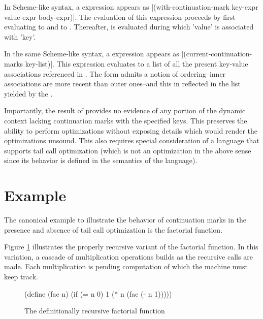 In Scheme-like syntax, a  expression appears as
\scheme|(with-continuation-mark key-expr value-expr body-expr)|. The evaluation of this
expression proceeds by first evaluating  to  and
 to . Thereafter,  is evaluated during 
which \scheme'value' is associated with \scheme'key'.

In the same Scheme-like syntax, a  expression appears
as \scheme|(current-continuation-marks key-list)|. This expression evaluates to a list of
all the present key-value associations referenced in . The
 form admits a notion of ordering--inner associations are
more recent than outer ones--and this in reflected in the list yielded by the
.

Importantly, the result of  provides no evidence of any
portion of the dynamic context lacking continuation marks with the specified keys. This
preserves the ability to perform optimizations without exposing details which would render
the optimizations unsound. This also requires special consideration of a language that
supports tail call optimization (which is not an optimization in the above sense since its
behavior is defined in the semantics of the language).

\section{Example}

The canonical example to illustrate the behavior of continuation marks in the presence and
absence of tail call optimization is the factorial function.

Figure \ref{fig:fac-rec} illustrates the properly recursive variant of the factorial
function. In this variation, a cascade of multiplication operations builds as the
recursive calls are made. Each multiplication is pending computation of which the machine 
must keep track.

\begin{figure}
\begin{schemeblock}
\begin{schemedisplay}
(define (fac n)
  (if (= n 0)
      1
      (* n (fac (- n 1)))))
\end{schemedisplay}
\end{schemeblock}
\caption{The definitionally recursive factorial function}
\label{fig:fac-rec}
\end{figure}

